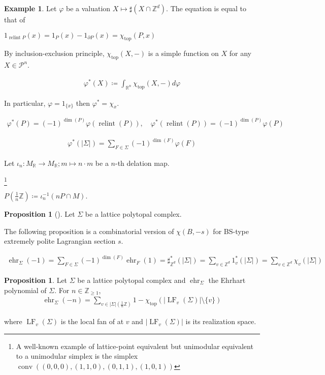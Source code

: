 \documentclass[a4paper,dvipdfmx,reqno,12pt]{amsart}
\theoremstyle{definition}
\newtheorem{Eg}[Thm]{Example}
\newtheorem{Prop}[Thm]{Proposition}
\newcommand{\deq}{\coloneqq}
\newcommand{\R}{\mathbb{R}}%
\newcommand{\Z}{\mathbb{Z}}%
\newcommand{\opn}[1]{\operatorname{#1}}
\numberwithin{equation}{section}
\begin{document}
\begin{Eg}
  Let $\varphi$ be a valuation $X\mapsto \sharp (X\cap \Z^{d})$.
  The equation is equal to that of
\end{Eg}





$1_{\opn{relint}P}(x)=1_{P}(x)-1_{\partial P}(x)=\chi_{\opn{top}}(P,x)$

By inclusion-exclusion principle, $\chi_{\opn{top}}(X,-)$ is a
simple function on $X$ for any $X\in \mathscr{P}^{n}$.

\begin{align}
  \varphi^{*}(X)\deq\int_{\R^{n}} \chi_{\opn{top}}(X,-)d\varphi
\end{align}

In particular, $\varphi=1_{\{x\}}$ then $\varphi^{*}=\chi_x$.

\begin{align}
  \varphi^{*}(P)=(-1)^{\dim(P)}\varphi(\opn{relint}(P)),
  \quad \varphi^{*}(\opn{relint}(P))=(-1)^{\dim(P)}\varphi(P)
\end{align}

\begin{align}
  \varphi^{*}(|\Sigma|)=\sum_{F\in \Sigma}(-1)^{\dim(F)}\varphi(F)
\end{align}



Let $\iota_n:M_{\R}\to M_{\R}; m\mapsto n\cdot m$ be a $n$-th delation map.

\footnote{A well-known example of lattice-point equivalent
but unimodular equivalent to a unimodular simplex is the simplex
$\opn{conv}((0,0,0),(1,1,0),(0,1,1),(1,0,1))$}

$P(\frac{1}{n}\Z)\deq \iota^{-1}_{n}(nP\cap M)$.

  \begin{Prop}[{\cite[{$(3\!\cdot\!1)$}]{MR154188}}]
    Let $\Sigma$ be a lattice polytopal complex.
  \end{Prop}

  The following proposition is a combinatorial version of $\chi(B,-s)$ for
  BS-type extremely polite Lagrangian section $s$.


\begin{align}
  \opn{ehr}_{\Sigma}(-1)=\sum_{F\in \Sigma}(-1)^{\dim(F)}\opn{ehr}_{F}(1)
  =\sharp_{\Z^{d}}^{*}(|\Sigma|)
  =\sum_{v\in \Z^{d}} 1_{v}^{*}(|\Sigma|)
  =\sum_{v\in \Z^{d}}\chi_v(|\Sigma|)
\end{align}

\begin{Prop}
  Let $\Sigma$ be a lattice polytopal complex and
  $\opn{ehr}_{\Sigma}$ the Ehrhart polynomial of $\Sigma$.
  For $n\in \Z_{\geq 1}$,
  \begin{align}
    \opn{ehr}_{\Sigma}(-n)=\sum_{v\in|\Sigma|(\frac{1}{n}\Z)}
    1-\chi_{\opn{top}}(|\opn{LF}_v(\Sigma)|\setminus \{v\})
  \end{align}

  where $\opn{LF}_v(\Sigma)$ is the local fan of at $v$ and
  $|\opn{LF}_v(\Sigma)|$ is its realization space.

\end{Prop}
\end{document}
